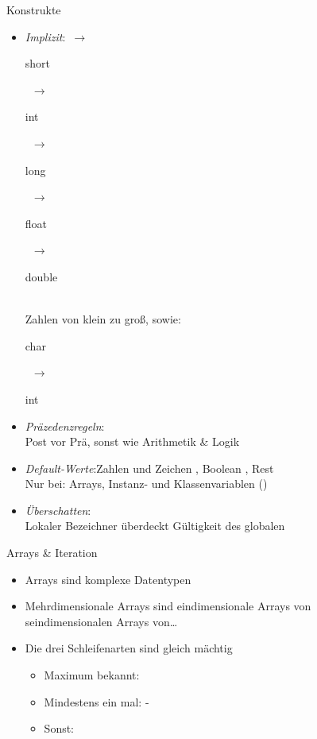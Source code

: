 {\def\mto{\ensuremath{\to}}
\def\dt#1{{\textcolor{paletteA!58!white}{\sbseries\strut#1}}}
\begin{frame}[c]{Konstrukte}
%
\begin{itemize}[<+(1)->]
   \itemsep15pt
   \item \textit{Implizit}:\quad\pause \dt{byte}~\mto~\dt{short}~\mto~\dt{int}~\mto~\dt{long}~\mto~\dt{float}~\mto~\dt{double}\\
   Zahlen von klein zu groß, sowie: \dt{char}~\mto~\dt{int}
   \item \textit{Präzedenzregeln}:\pause\\
   Post vor Prä, sonst wie Arithmetik \& Logik
   \item \textit{Default-Werte}:\quad\pause Zahlen und Zeichen , Boolean , Rest \pause\\
   Nur bei: Arrays, Instanz- und Klassenvariablen ()
   \item \textit{Überschatten}:\pause\\
   Lokaler Bezeichner überdeckt Gültigkeit des globalen
\end{itemize}
\end{frame}

\def\mto{\ensuremath{\to}}
\begin{frame}[c]{Arrays \& Iteration}
%
\begin{itemize}[<+(1)->]
   \itemsep15pt
   \item Arrays sind komplexe Datentypen
   \item Mehrdimensionale Arrays sind eindimensionale Arrays von\\seindimensionalen Arrays von\ldots
   \item Die drei Schleifenarten sind gleich mächtig \begin{itemize}
      \item Maximum bekannt: 
      \item Mindestens ein mal: -
      \item Sonst: 
   \end{itemize}
\end{itemize}
\end{frame}

}

